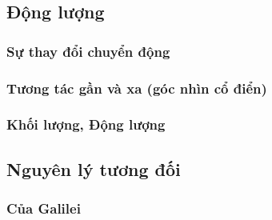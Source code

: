 \subsection{Động lượng}
\begin{frame}
\frametitle{Sự thay đổi chuyển động}
\end{frame}
\begin{frame}
\frametitle{Tương tác gần và xa (góc nhìn cổ điển)}
\end{frame}
\begin{frame}
    \frametitle{Khối lượng, Động lượng}
\end{frame}
\subsection{Nguyên lý tương đối}
\begin{frame}
    \frametitle{Của Galilei}
\end{frame}